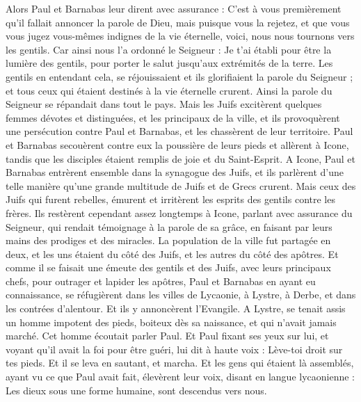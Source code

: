 \begin{multicols}{2}
Alors Paul et Barnabas leur dirent avec assurance : C’est à vous premièrement qu'il fallait annoncer la parole de Dieu, mais puisque vous la rejetez, et que vous vous jugez vous-mêmes indignes de la vie éternelle, voici, nous nous tournons vers les gentils.
Car ainsi nous l’a ordonné le Seigneur : Je t'ai établi pour être la lumière des gentils, pour porter le salut jusqu’aux extrémités de la terre.
Les gentils en entendant cela, se réjouissaient et ils glorifiaient la parole du Seigneur ; et tous ceux qui étaient destinés à la vie éternelle crurent.
Ainsi la parole du Seigneur se répandait dans tout le pays.
Mais les Juifs excitèrent quelques femmes dévotes et distinguées, et les principaux de la ville, et ils provoquèrent une persécution contre Paul et Barnabas, et les chassèrent de leur territoire.
Paul et Barnabas secouèrent contre eux la poussière de leurs pieds et allèrent à Icone,
tandis que les disciples étaient remplis de joie et du Saint-Esprit.
\VerseOne{}A Icone, Paul et Barnabas entrèrent ensemble dans la synagogue des Juifs, et ils parlèrent d'une telle manière qu'une grande multitude de Juifs et de Grecs crurent.
Mais ceux des Juifs qui furent rebelles, émurent et irritèrent les esprits des gentils contre les frères.
Ils restèrent cependant assez longtemps à Icone, parlant avec assurance du Seigneur, qui rendait témoignage à la parole de sa grâce, en faisant par leurs mains des prodiges et des miracles.
La population de la ville fut partagée en deux, et les uns étaient du côté des Juifs, et les autres du côté des apôtres.
Et comme il se faisait une émeute des gentils et des Juifs, avec leurs principaux chefs, pour outrager et lapider les apôtres,
Paul et Barnabas en ayant eu connaissance, se réfugièrent dans les villes de Lycaonie, à Lystre, à Derbe, et dans les contrées d'alentour.
Et ils y annoncèrent l'Evangile.
A Lystre, se tenait assis un homme impotent des pieds, boiteux dès sa naissance, et qui n'avait jamais marché.
Cet homme écoutait parler Paul. Et Paul fixant ses yeux sur lui, et voyant qu'il avait la foi pour être guéri,
lui dit à haute voix : Lève-toi droit sur tes pieds. Et il se leva en sautant, et marcha.
Et les gens qui étaient là assemblés, ayant vu ce que Paul avait fait, élevèrent leur voix, disant en langue lycaonienne : Les dieux sous une forme humaine, sont descendus vers nous.

\end{multicols}
